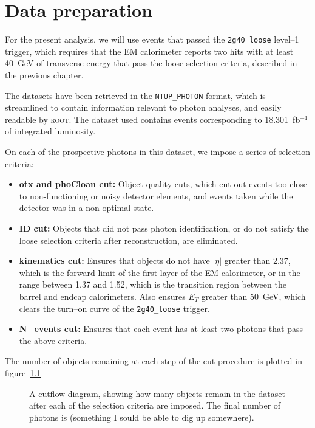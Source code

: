 \chapter{Data preparation}

For the present analysis, we will use events that passed the \texttt{2g40\_loose} level--1 trigger, which requires that the EM calorimeter reports two hits with at least 40~GeV of transverse energy that pass the loose selection criteria, described in the previous chapter.

The datasets have been retrieved in the \texttt{NTUP\_PHOTON} format, which is streamlined to contain information relevant to photon analyses, and easily readable by \textsc{root}. The dataset used contains events corresponding to 18.301~fb$^{-1}$ of integrated luminosity.

On each of the prospective photons in this dataset, we impose a series of selection criteria:

\begin{itemize}
\item \textbf{otx and phoCloan cut:} Object quality cuts, which cut out events too close to non-functioning or noisy detector elements, and events taken while the detector was in a non-optimal state.
\item \textbf{ID cut:} Objects that did not pass photon identification, or do not satisfy the loose selection criteria after reconstruction, are eliminated.
\item \textbf{kinematics cut:} Ensures that objects do not have $|\eta|$ greater than 2.37, which is the forward limit of the first layer of the EM calorimeter, or in the range between 1.37 and 1.52, which is the transition region between the barrel and endcap calorimeters. Also ensures $E_T$ greater than 50~GeV, which clears the turn--on curve of the \texttt{2g40\_loose} trigger.
\item \textbf{N\_events cut:} Ensures that each event has at least two photons that pass the above criteria.

\end{itemize}

The number of objects remaining at each step of the cut procedure is plotted in figure~\ref{cutflow}

\begin{figure}[htp]
\begin{minipage}[b]{.69\textwidth}
\begin{infilsf} \tiny

\end{infilsf}
\end{minipage}\hfill\begin{minipage}[b]{.3\textwidth}
\caption{A cutflow diagram, showing how many objects remain in the dataset after each of the selection criteria are imposed. The final number of photons is (something I sould be able to dig up somewhere).
\label{cutflow}}
\end{minipage}
\end{figure}


